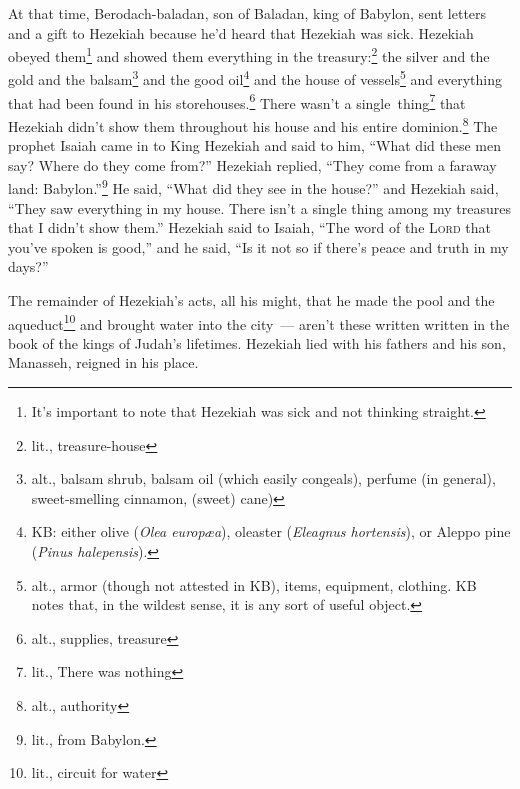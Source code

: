 \begin{inparaenum}
     At that time, Berodach-baladan, son of Baladan, king of Babylon, sent letters and a gift to Hezekiah because he'd heard that Hezekiah was sick.%
     Hezekiah obeyed them\footnote{It's important to note that Hezekiah was sick and not thinking straight.} and showed them everything in the treasury:\footnote{lit., treasure-house} the silver and the gold and the balsam\footnote{alt., balsam shrub, balsam oil (which easily congeals), perfume (in general), sweet-smelling cinnamon, (sweet) cane)} and the good oil\footnote{KB: either olive (\textit{Olea europ\ae a}), oleaster (\textit{Eleagnus hortensis}), or Aleppo pine (\textit{Pinus halepensis}).} and the house of vessels\footnote{alt., armor (though not attested in KB), items, equipment, clothing. KB notes that, in the wildest sense, it is any sort of useful object.} and everything that had been found in his storehouses.\footnote{alt., supplies, treasure} There wasn't a single\understood\ thing\footnote{lit., There was nothing} that Hezekiah didn't show them throughout his house and his entire dominion.\footnote{alt., authority}%
     The prophet Isaiah came in to King Hezekiah and said to him, ``What did these men say? Where do they come from?'' Hezekiah replied, ``They come from a faraway land: Babylon.''\footnote{lit., from Babylon.}%
     He said, ``What did they see in the house?'' and Hezekiah said, ``They saw everything in my house. There isn't a single thing among my treasures that I didn't show them.''%
     Hezekiah said to Isaiah, ``The word of the \textsc{Lord} that you've spoken is good,'' and he said, ``Is it not so if there's peace and truth in my days?''%
    
     The remainder of Hezekiah's acts, all his might, that he made the pool and the aqueduct\footnote{lit., circuit for water} and brought water into the city~--- aren't these written written in the book of the kings of Judah's lifetimes.%
     Hezekiah lied with his fathers and his son, Manasseh, reigned in his place.%
\end{inparaenum}
